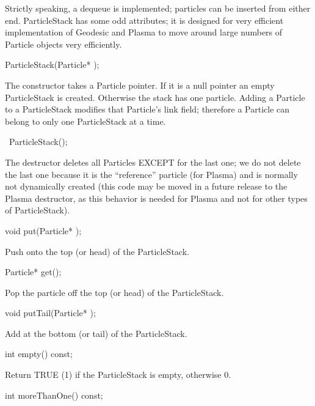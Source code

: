 Strictly speaking, a dequeue is implemented; particles can be inserted
from either end.  ParticleStack has some odd attributes; it is designed
for very efficient implementation of Geodesic and Plasma to move around
large numbers of Particle objects very efficiently.

\begin{example}
ParticleStack(Particle* );
\end{example}

The constructor takes a Particle pointer.  If it is a null pointer an
empty ParticleStack is created.  Otherwise the stack has one particle.
Adding a Particle to a ParticleStack modifies that Particle's link
field; therefore a Particle can belong to only one ParticleStack at a
time.

\begin{example}
~ParticleStack();
\end{example}

The destructor deletes all Particles EXCEPT for the last one; we do not
delete the last one because it is the ``reference'' particle (for
Plasma) and is normally not dynamically created (this code may be moved
in a future release to the Plasma destructor, as this behavior is needed
for Plasma and not for other types of ParticleStack).

\begin{example}
void put(Particle* );
\end{example}

Push  onto the top (or head) of the ParticleStack.

\begin{example}
Particle* get();
\end{example}

Pop the particle off the top (or head) of the ParticleStack.

\begin{example}
void putTail(Particle* );
\end{example}

Add  at the bottom (or tail) of the ParticleStack.

\begin{example}
int empty() const;
\end{example}

Return TRUE (1) if the ParticleStack is empty, otherwise 0.

\begin{example}
int moreThanOne() const;
\end{example}

